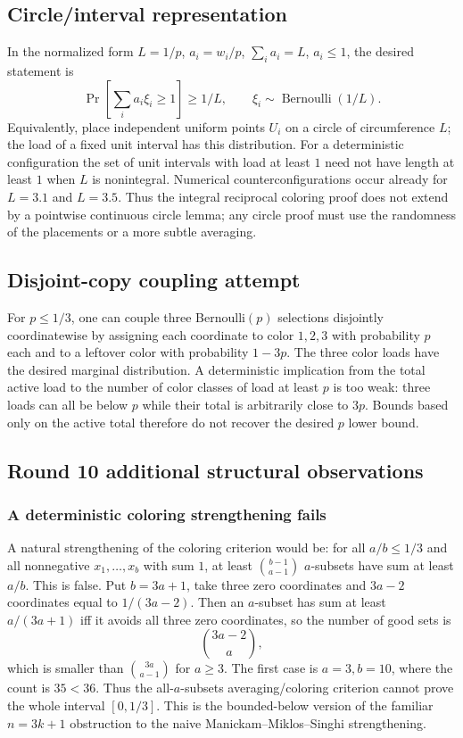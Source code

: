 \documentclass[12pt]{article}
\newcommand{\Ber}{\operatorname{Bernoulli}}
\begin{document}
\subsection*{Circle/interval representation}

In the normalized form \(L=1/p\), \(a_i=w_i/p\), \(\sum_i a_i=L\),
\(a_i\le1\), the desired statement is
\[
 \Pr\left[\sum_i a_i\xi_i\ge1\right]\ge1/L,\qquad \xi_i\sim\Ber(1/L).
\]
Equivalently, place independent uniform points \(U_i\) on a circle of
circumference \(L\); the load of a fixed unit interval has this distribution.
For a deterministic configuration the set of unit intervals with load at least
\(1\) need not have length at least \(1\) when \(L\) is nonintegral.  Numerical
counterconfigurations occur already for \(L=3.1\) and \(L=3.5\).  Thus the
integral reciprocal coloring proof does not extend by a pointwise continuous
circle lemma; any circle proof must use the randomness of the placements or a
more subtle averaging.

\subsection*{Disjoint-copy coupling attempt}

For \(p\le1/3\), one can couple three Bernoulli\((p)\) selections disjointly
coordinatewise by assigning each coordinate to color \(1,2,3\) with probability
\(p\) each and to a leftover color with probability \(1-3p\).  The three color
loads have the desired marginal distribution.  A deterministic implication from
the total active load to the number of color classes of load at least \(p\) is
too weak: three loads can all be below \(p\) while their total is arbitrarily
close to \(3p\).  Bounds based only on the active total therefore do not recover
the desired \(p\) lower bound.



\subsection*{Round 10 additional structural observations}

\subsubsection*{A deterministic coloring strengthening fails}

A natural strengthening of the coloring criterion would be: for all
\(a/b\le 1/3\) and all nonnegative \(x_1,\ldots,x_b\) with sum \(1\), at
least \(\binom{b-1}{a-1}\) \(a\)-subsets have sum at least \(a/b\).  This is
false.  Put \(b=3a+1\), take three zero coordinates and \(3a-2\) coordinates
equal to \(1/(3a-2)\).  Then an \(a\)-subset has sum at least
\(a/(3a+1)\) iff it avoids all three zero coordinates, so the number of good
sets is
\[
        \binom{3a-2}{a},
\]
which is smaller than \(\binom{3a}{a-1}\) for \(a\ge3\).  The first case is
\(a=3,b=10\), where the count is \(35<36\).  Thus the all-\(a\)-subsets
averaging/coloring criterion cannot prove the whole interval \([0,1/3]\).
This is the bounded-below version of the familiar \(n=3k+1\) obstruction to
the naive Manickam--Miklos--Singhi strengthening.
\end{document}
